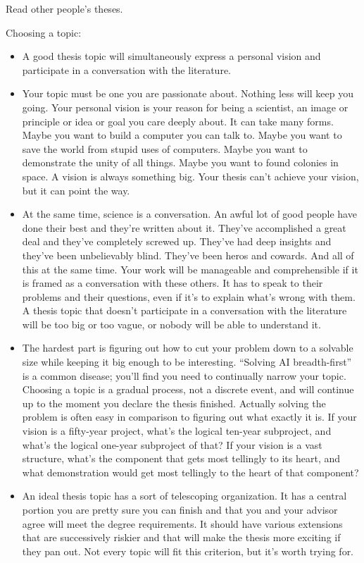 Read other people's theses.

Choosing a topic:
\begin{itemize}
\item A good thesis topic will simultaneously express a personal vision and participate in a conversation with the literature.
\item Your topic must be one you are passionate about. Nothing less will keep you going. Your personal vision is your reason for being a scientist, an image or principle or idea or goal you care deeply about. It can take many forms. Maybe you want to build a computer you can talk to. Maybe you want to save the world from stupid uses of computers. Maybe you want to demonstrate the unity of all things. Maybe you want to found colonies in space. A vision is always something big. Your thesis can’t achieve your vision, but it can point the way.
\item At the same time, science is a conversation. An awful lot of good people have done their best and they’re written about it. They’ve accomplished a great deal and they’ve completely screwed up. They’ve had deep insights and they’ve been unbelievably blind. They’ve been heros and cowards. And all of this at the same time. Your work will be manageable and comprehensible if it is framed as a conversation with these others. It has to speak to their problems and their questions, even if it’s to explain what’s wrong with them.  A thesis topic that doesn’t participate in a conversation with the literature will be too big or too vague, or nobody will be able to understand it.
\item The hardest part is figuring out how to cut your problem down to a solvable size while keeping it big enough to be interesting. “Solving AI breadth-first” is a common disease; you’ll find you need to continually narrow your topic.  Choosing a topic is a gradual process, not a discrete event, and will continue up to the moment you declare the thesis finished. Actually solving the problem is often easy in comparison to figuring out what exactly it is. If your vision is a fifty-year project, what’s the logical ten-year subproject, and what’s the logical one-year subproject of that? If your vision is a vast structure, what’s the component that gets most tellingly to its heart, and what demonstration would get most tellingly to the heart of that component?
\item An ideal thesis topic has a sort of telescoping organization. It has a central portion you are pretty sure you can finish and that you and your advisor agree will meet the degree requirements. It should have various extensions that are successively riskier and that will make the thesis more exciting if they pan out. Not every topic will fit this criterion, but it’s worth trying for.

\end{itemize}
